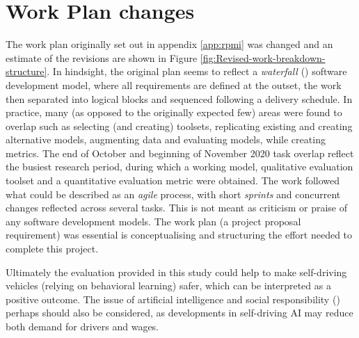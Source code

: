 \section{Work Plan changes}
The work plan originally set out in appendix \ref{app:rpmi} was changed and an estimate of the revisions are shown in Figure \ref{fig:Revised-work-breakdown-structure}. In hindsight, the original plan seems to reflect a \textit{waterfall} (\cite{balaji2012waterfall}) software development model, where all requirements are defined at the outset, the work then separated into logical blocks and sequenced following a delivery schedule. In practice, many (as opposed to the originally expected few) areas were found to overlap such as selecting (and creating) toolsets, replicating existing and creating alternative models, augmenting data and evaluating models, while creating metrics. The end of October and beginning of November 2020 task overlap reflect the busiest research period, during which a working model, qualitative evaluation toolset and a quantitative evaluation metric were obtained. The work followed what could be described as an \textit{agile} process, with short \textit{sprints} and concurrent changes reflected across several tasks. This is not meant as criticism or praise of any software development models. The work plan (a project proposal requirement) was essential is conceptualising and structuring the effort needed to complete this project.


Ultimately the evaluation provided in this study could help to make self-driving vehicles (relying on behavioral learning) safer, which can be interpreted as a positive outcome. The issue of artificial intelligence and social responsibility (\cite{saveliev2020artificial}) perhaps should also be considered, as developments in self-driving AI may reduce both demand for drivers and wages.



